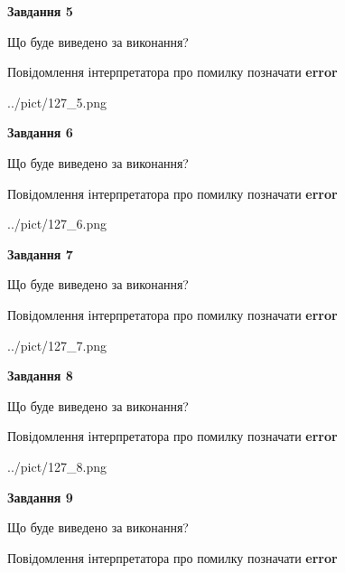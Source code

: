 \documentclass[11pt, ukrainian]{article}
\begin{document}
{\begin {large}
{\begin {center}\textbf{Завдання 5}\end {center}}\par
Що буде виведено за виконання? \par
Повідомлення інтерпретатора про помилку позначати \textbf{error}

\begin{center}
	{../pict/127_5.png}
\end{center}
\newpage

{\begin {center}\textbf{Завдання 6}\end {center}}\par
Що буде виведено за виконання? \par
Повідомлення інтерпретатора про помилку позначати \textbf{error}

\begin{center}
	{../pict/127_6.png}
\end{center}
\newpage

{\begin {center}\textbf{Завдання 7}\end {center}}\par
Що буде виведено за виконання? \par
Повідомлення інтерпретатора про помилку позначати \textbf{error}

\begin{center}
	{../pict/127_7.png}
\end{center}
\newpage

{\begin {center}\textbf{Завдання 8}\end {center}}\par
Що буде виведено за виконання? \par
Повідомлення інтерпретатора про помилку позначати \textbf{error}

\begin{center}
	{../pict/127_8.png}
\end{center}
\newpage

{\begin {center}\textbf{Завдання 9}\end {center}}\par
Що буде виведено за виконання? \par
Повідомлення інтерпретатора про помилку позначати \textbf{error}


\end{large}}
\end{document}
